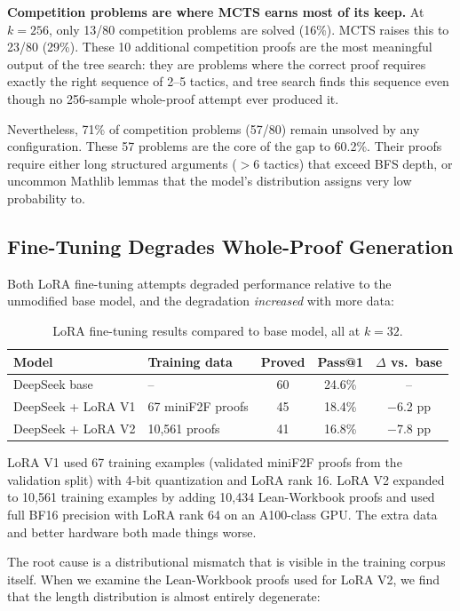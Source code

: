 \documentclass[openany, amssymb, psamsfonts]{amsart}
\theoremstyle{definition}
\numberwithin{equation}{section}
\begin{document}
\textbf{Competition problems are where MCTS earns most of its keep.}
At $k=256$, only 13/80 competition problems are solved (16\%).
MCTS raises this to 23/80 (29\%).
These 10 additional competition proofs are the most meaningful output of
the tree search: they are problems where the correct proof requires
exactly the right sequence of 2--5 tactics, and tree search finds this
sequence even though no 256-sample whole-proof attempt ever produced it.

Nevertheless, 71\% of competition problems (57/80) remain unsolved by
any configuration.
These 57 problems are the core of the gap to 60.2\%.
Their proofs require either long structured arguments ($>6$ tactics)
that exceed BFS depth, or uncommon Mathlib lemmas that the model's
distribution assigns very low probability to.

\subsection{Fine-Tuning Degrades Whole-Proof Generation}
\label{sec:lora}

Both LoRA fine-tuning attempts degraded performance relative to the
unmodified base model, and the degradation \emph{increased} with more data:

\begin{table}[h]
\centering
\caption{LoRA fine-tuning results compared to base model, all at $k=32$.}
\label{tab:lora}
\begin{tabular}{@{}llccc@{}}
\toprule
Model & Training data & Proved & Pass@1 & $\Delta$ vs.\ base \\
\midrule
DeepSeek base & -- & 60 & 24.6\% & -- \\
DeepSeek + LoRA V1 & 67 miniF2F proofs & 45 & 18.4\% & $-$6.2 pp \\
DeepSeek + LoRA V2 & 10,561 proofs & 41 & 16.8\% & $-$7.8 pp \\
\bottomrule
\end{tabular}
\end{table}

LoRA V1 used 67 training examples (validated miniF2F proofs from the
validation split) with 4-bit quantization and LoRA rank 16.
LoRA V2 expanded to 10,561 training examples by adding 10,434 Lean-Workbook
proofs and used full BF16 precision with LoRA rank 64 on an A100-class GPU.
The extra data and better hardware both made things worse.

The root cause is a distributional mismatch that is visible in the training
corpus itself.
When we examine the Lean-Workbook proofs used for LoRA V2, we find that
the length distribution is almost entirely degenerate:
\end{document}
